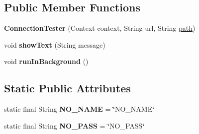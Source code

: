 \subsection*{Public Member Functions}
\begin{DoxyCompactItemize}
\item 
{\bfseries Connection\+Tester} (Context context, String url, String \hyperlink{classcom_1_1example_1_1sebastian_1_1tindertp_1_1internetTools_1_1MediaDownloader_a99ab591fedeaa392762bf534499a2279}{path})\hypertarget{classcom_1_1example_1_1sebastian_1_1tindertp_1_1internetTools_1_1ConnectionTester_a1ee45bf233705ca71e6c8e0f1f6a2295}{}\label{classcom_1_1example_1_1sebastian_1_1tindertp_1_1internetTools_1_1ConnectionTester_a1ee45bf233705ca71e6c8e0f1f6a2295}

\item 
void {\bfseries show\+Text} (String message)\hypertarget{classcom_1_1example_1_1sebastian_1_1tindertp_1_1internetTools_1_1ConnectionTester_ab6b984062bdd19c2722651eb4f478bab}{}\label{classcom_1_1example_1_1sebastian_1_1tindertp_1_1internetTools_1_1ConnectionTester_ab6b984062bdd19c2722651eb4f478bab}

\item 
void {\bfseries run\+In\+Background} ()\hypertarget{classcom_1_1example_1_1sebastian_1_1tindertp_1_1internetTools_1_1ConnectionTester_aa3c04a189a7747c96457f1c5b8d73cbe}{}\label{classcom_1_1example_1_1sebastian_1_1tindertp_1_1internetTools_1_1ConnectionTester_aa3c04a189a7747c96457f1c5b8d73cbe}

\end{DoxyCompactItemize}
\subsection*{Static Public Attributes}
\begin{DoxyCompactItemize}
\item 
static final String {\bfseries N\+O\+\_\+\+N\+A\+ME} = \char`\"{}N\+O\+\_\+\+N\+A\+ME\char`\"{}\hypertarget{classcom_1_1example_1_1sebastian_1_1tindertp_1_1internetTools_1_1ConnectionTester_ac09c375c97fe4e4da4e35412c41d6ab4}{}\label{classcom_1_1example_1_1sebastian_1_1tindertp_1_1internetTools_1_1ConnectionTester_ac09c375c97fe4e4da4e35412c41d6ab4}

\item 
static final String {\bfseries N\+O\+\_\+\+P\+A\+SS} = \char`\"{}N\+O\+\_\+\+P\+A\+SS\char`\"{}\hypertarget{classcom_1_1example_1_1sebastian_1_1tindertp_1_1internetTools_1_1ConnectionTester_a0f49df55929513cb4d013bdff798fe75}{}\label{classcom_1_1example_1_1sebastian_1_1tindertp_1_1internetTools_1_1ConnectionTester_a0f49df55929513cb4d013bdff798fe75}

\end{DoxyCompactItemize}
